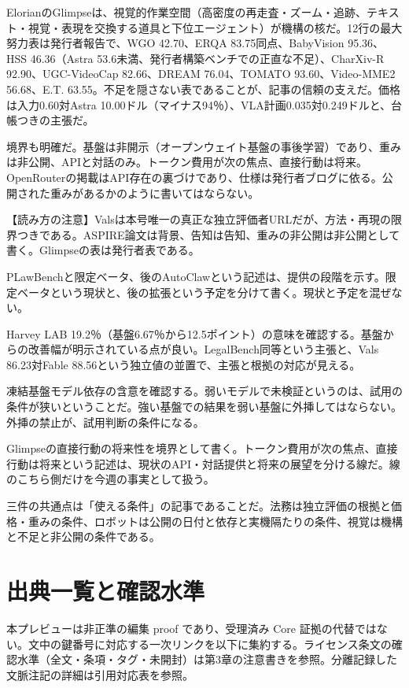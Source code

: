 \documentclass[lualatex,a4paper,10pt]{jlreq}
\begin{document}
ElorianのGlimpseは、視覚的作業空間（高密度の再走査・ズーム・追跡、テキスト・視覚・表現を交換する道具と下位エージェント）が機構の核だ。12行の最大努力表は発行者報告で、WGO 42.70、ERQA 83.75同点、BabyVision 95.36、HSS 46.36（Astra 53.6未満、発行者構築ベンチでの正直な不足）、CharXiv-R 92.90、UGC-VideoCap 82.66、DREAM 76.04、TOMATO 93.60、Video-MME2 56.68、E.T. 63.55。不足を隠さない表であることが、記事の信頼の支えだ。価格は入力0.60対Astra 10.00ドル（マイナス94％）、VLA計画0.035対0.249ドルと、台帳つきの主張だ。
\cite{B58,B59}


境界も明確だ。基盤は非開示（オープンウェイト基盤の事後学習）であり、重みは非公開、APIと対話のみ。トークン費用が次の焦点、直接行動は将来。OpenRouterの掲載はAPI存在の裏づけであり、仕様は発行者ブログに依る。公開された重みがあるかのように書いてはならない。
\cite{B58,B59}


\begin{tcolorbox}[colback=SurveySoft,colframe=SurveyRule,arc=1mm,boxrule=0.4pt,left=2mm,right=2mm]
【読み方の注意】Valsは本号唯一の真正な独立評価者URLだが、方法・再現の限界つきである。ASPIRE論文は背景、告知は告知、重みの非公開は非公開として書く。Glimpseの表は発行者表である。
\end{tcolorbox}
\cite{B56,B58,B57,B59,B53,B54,B55}


PLawBenchと限定ベータ、後のAutoClawという記述は、提供の段階を示す。限定ベータという現状と、後の拡張という予定を分けて書く。現状と予定を混ぜない。
\cite{B53,B54,B55}


Harvey LAB 19.2％（基盤6.67％から12.5ポイント）の意味を確認する。基盤からの改善幅が明示されている点が良い。LegalBench同等という主張と、Vals 86.23対Fable 88.56という独立値の並置で、主張と根拠の対応が見える。
\cite{B53,B54,B55}


凍結基盤モデル依存の含意を確認する。弱いモデルで未検証というのは、試用の条件が狭いということだ。強い基盤での結果を弱い基盤に外挿してはならない。外挿の禁止が、試用判断の条件になる。
\cite{B56,B57}


Glimpseの直接行動の将来性を境界として書く。トークン費用が次の焦点、直接行動は将来という記述は、現状のAPI・対話提供と将来の展望を分ける線だ。線のこちら側だけを今週の事実として扱う。
\cite{B58,B59}


三件の共通点は「使える条件」の記事であることだ。法務は独立評価の根拠と価格・重みの条件、ロボットは公開の日付と依存と実機隔たりの条件、視覚は機構と不足と非公開の条件である。
\cite{B56,B58,B57,B59,B53,B54,B55}


\onecolumn
\section*{出典一覧と確認水準}
本プレビューは非正準の編集 proof であり、受理済み Core 証拠の代替ではない。文中の鍵番号に対応する一次リンクを以下に集約する。ライセンス条文の確認水準（全文・条項・タグ・未開封）は第3章の注意書きを参照。分離記録した文脈注記の詳細は引用対応表を参照。
\end{document}
